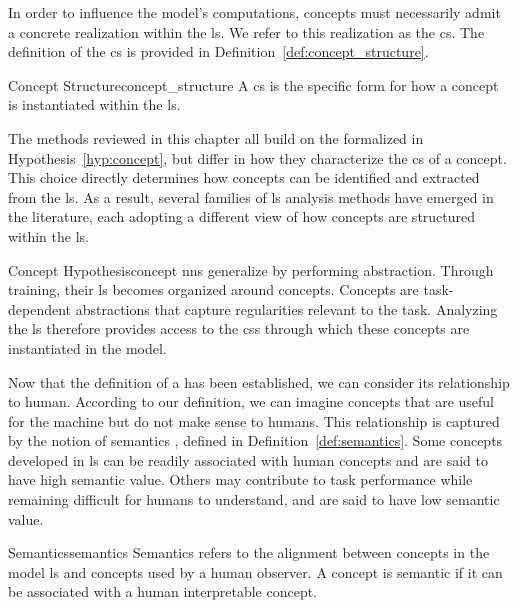 In order to influence the model's computations, concepts must necessarily admit a concrete realization within the \gls{ls}.
We refer to this realization as the \gls{cs}.
The definition of the \gls{cs} is provided in Definition~\ref{def:concept_structure}.

\begin{definition}{Concept Structure}{concept_structure}
A \gls{cs} is the specific form for how a concept is instantiated within the \gls{ls}.
\end{definition}

The methods reviewed in this chapter all build on the \ConceptHypothesisName formalized in Hypothesis~\ref{hyp:concept}, but differ in how they characterize the \gls{cs} of a concept.
This choice directly determines how concepts can be identified and extracted from the \gls{ls}.
As a result, several families of \gls{ls} analysis methods have emerged in the literature, each adopting a different view of how concepts are structured within the \gls{ls}.

\begin{hypothesis}{Concept Hypothesis}{concept}
\glspl{nn} generalize by performing abstraction.
Through training, their \gls{ls} becomes organized around concepts.
Concepts are task-dependent abstractions that capture regularities relevant to the task.
Analyzing the \gls{ls} therefore provides access to the \glspl{cs} through which these concepts are instantiated in the model.
\end{hypothesis}

Now that the definition of a \ConceptHypothesisName has been established, we can consider its relationship to human.
According to our definition, we can imagine concepts that are useful for the machine but do not make sense to humans.
This relationship is captured by the notion of semantics \parencite{marconato2023interpretabilitymindbeholdercausal}, defined in Definition~\ref{def:semantics}.
Some concepts developed in \gls{ls} can be readily associated with human concepts and are said to have high semantic value.
Others may contribute to task performance while remaining difficult for humans to understand, and are said to have low semantic value.

\begin{definition}{Semantics}{semantics}
Semantics refers to the alignment between concepts in the model \gls{ls} and concepts used by a human observer.  
A concept is semantic if it can be associated with a human interpretable concept.  
\end{definition}

